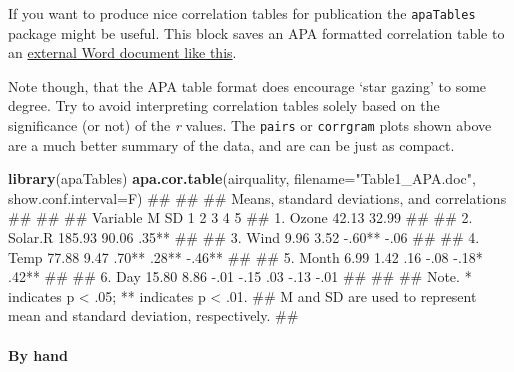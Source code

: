 \documentclass[]{article}
\newenvironment{Shaded}{\begin{snugshade}}{\end{snugshade}}
\newcommand{\KeywordTok}[1]{\textcolor[rgb]{0.13,0.29,0.53}{\textbf{#1}}}
\newcommand{\DataTypeTok}[1]{\textcolor[rgb]{0.13,0.29,0.53}{#1}}
\newcommand{\StringTok}[1]{\textcolor[rgb]{0.31,0.60,0.02}{#1}}
\newcommand{\NormalTok}[1]{#1}
\let\oldparagraph\paragraph
\renewcommand{\paragraph}[1]{\oldparagraph{#1}\mbox{}}
\theoremstyle{definition}
\theoremstyle{definition}
\theoremstyle{definition}
\theoremstyle{remark}
\begin{document}
If you want to produce nice correlation tables for publication the
\texttt{apaTables} package might be useful. This block saves an APA
formatted correlation table to an \href{Table1_APA.doc}{external Word
document like this}.

Note though, that the APA table format does encourage `star gazing' to
some degree. Try to avoid interpreting correlation tables solely based
on the significance (or not) of the \emph{r} values. The \texttt{pairs}
or \texttt{corrgram} plots shown above are a much better summary of the
data, and are can be just as compact.

\begin{Shaded}
\begin{Highlighting}[]
\KeywordTok{library}\NormalTok{(apaTables)}
\KeywordTok{apa.cor.table}\NormalTok{(airquality, }\DataTypeTok{filename=}\StringTok{"Table1_APA.doc"}\NormalTok{, }\DataTypeTok{show.conf.interval=}\NormalTok{F)}
\NormalTok{## }
\NormalTok{## }
\NormalTok{## Means, standard deviations, and correlations}
\NormalTok{##  }
\NormalTok{## }
\NormalTok{##   Variable   M      SD    1      2     3      4     5   }
\NormalTok{##   1. Ozone   42.13  32.99                               }
\NormalTok{##                                                         }
\NormalTok{##   2. Solar.R 185.93 90.06 .35**                         }
\NormalTok{##                                                         }
\NormalTok{##   3. Wind    9.96   3.52  -.60** -.06                   }
\NormalTok{##                                                         }
\NormalTok{##   4. Temp    77.88  9.47  .70**  .28** -.46**           }
\NormalTok{##                                                         }
\NormalTok{##   5. Month   6.99   1.42  .16    -.08  -.18*  .42**     }
\NormalTok{##                                                         }
\NormalTok{##   6. Day     15.80  8.86  -.01   -.15  .03    -.13  -.01}
\NormalTok{##                                                         }
\NormalTok{## }
\NormalTok{## Note. * indicates p < .05; ** indicates p < .01.}
\NormalTok{## M and SD are used to represent mean and standard deviation, respectively.}
\NormalTok{## }
\end{Highlighting}
\end{Shaded}

\paragraph{By hand}\label{by-hand}
\end{document}
